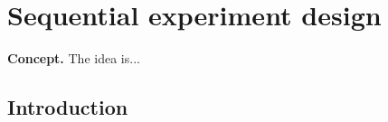 \chapter{\sffamily Sequential experiment design}

{\bfseries\sffamily Concept.} The idea is...

\section{\sffamily Introduction}